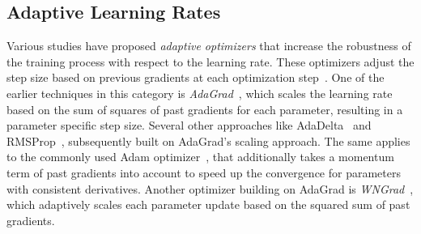 \documentclass[runningheads]{llncs}
\begin{document}
\subsection{Adaptive Learning Rates}


Various studies have proposed \textit{adaptive optimizers} that increase the robustness of the training process with respect to the learning rate.
These optimizers adjust the step size based on previous gradients at each optimization step~\cite{duchiAdaptiveSubgradientMethods2011}. 
One of the earlier techniques in this category is \textit{AdaGrad}~\cite{duchiAdaptiveSubgradientMethods2011}, which scales the learning rate based on the sum of squares of past gradients for each parameter, resulting in a parameter specific step size.
Several other approaches like AdaDelta~\cite{zeilerADADELTAAdaptiveLearning2012a} and RMSProp~\cite{tielemanLecture5rmspropDivide2012}, subsequently built on AdaGrad's scaling approach.
The same applies to the commonly used Adam optimizer~\cite{kingmaAdamMethodStochastic2017b}, that additionally takes a momentum term of past gradients into account to speed up the convergence for parameters with consistent derivatives.
Another optimizer building on AdaGrad is \textit{WNGrad}~\cite{wuWNGradLearnLearning2020}, which adaptively scales each parameter update based on the squared sum of past gradients.
\end{document}
